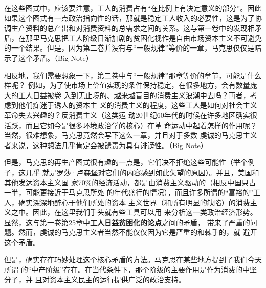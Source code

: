 在这些图式中，应该要注意，工人的消费占有“在比例上有决定意义的部分”。因此如果这个图式有一点政治指向性的话，那就是稳定工人收入的必要性，这是为了协调生产资料的总产出和对消费资料的总需求之间的关系。这与第一卷中的发现相矛盾，在那里马克思把工人阶级日渐加剧的贫困化视作是自由市场资本主义不可避免的一个结果。但是，因为第二卷并没有与“一般规律”等价的一章，马克思仅仅是暗示了这个矛盾。（Big Note）

相反地，我们需要想象一下，第二卷中与“一般规律”那章等价的章节，可能是什么样呢？
例如，为了使市场上价值实现的条件保持稳定，在很多地方，会有数量庞大的工人日益被卷
入到无止境的、越来越盲目的消费主义浪潮中去吗？再者，考虑到他们痴迷于诱人的资本主
义的消费主义的程度，这些工人是如何对社会主义革命失去兴趣的？反消费主义（这类运
动20世纪60年代的时候在许多地区确实很活跃，而且它如今是很多环境政治学的核心）在革
命运动中起着怎样的作用呢？当然，很难想象，马克思竟然会写下这么一章，并且对于多数
虔诚的马克思主义者来说，这种想法几乎肯定会被谴责为具有诽谤性。（Big Note）

但是，马克思的再生产图式很有趣的一点是，它们决不拒绝这些可能性（举个例子，这几乎
就是罗莎·卢森堡对它们的内容感到如此失望的原因）。并且，美国和其他发达资本主义国
家70\%的经济活动，都是由消费主义驱动的（相反中国只占一半，可能更接近于马克思所处
的年代盛行的情况），而且许多所谓的“富裕的”工人，确实深深地醉心于他们所处的资本
主义世界（和所有明显的缺陷）的消费主义之中。因此，在这里我们手头就有些工具可以用
来分析这一类政治经济形势。显然，这与第一卷第25章中\textbf{工人日益贫困化的论点}之间的矛盾，
带来了严重的问题。然而，虔诚的马克思主义者当然不能仅仅因为它是严重的和棘手的，就
避开这个矛盾。

但是，确实存在巧妙处理这个核心矛盾的方法。马克思在某些地方提到了我们今天所谓
的“中产阶级”存在。在当代条件下，那个阶级的主要作用是作为消费的中坚分子，并
且对资本主义民主的运行提供广泛的政治支持。

